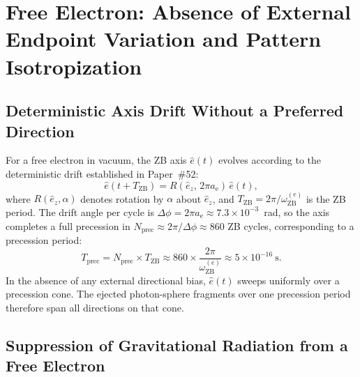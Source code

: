\documentclass[%
 reprint, amsmath,amssymb, aps, prd, ]{revtex4-2}
\numberwithin{equation}{section}
\newcommand{\anom}{a_{\mathrm{e}}}
\newcommand{\ehat}[1]{\hat{e}_{#1}}
\newcommand{\omZBe}{\omega_{\mathrm{ZB}}^{(e)}}
\begin{document}
\section{Free Electron: Absence of External Endpoint Variation and Pattern Isotropization}
\label{sec:free_electron}

\subsection{Deterministic Axis Drift Without a Preferred Direction}

For a free electron in vacuum, the ZB axis $\hat{e}(t)$ evolves according to the deterministic drift established in Paper~\#52:
\begin{equation}
\hat{e}(t + T_\mathrm{ZB}) = R(\ehat{z},\, 2\pi\anom)\,\hat{e}(t),
\label{eq:axis_drift_free}
\end{equation}
where $R(\ehat{z}, \alpha)$ denotes rotation by $\alpha$ about $\ehat{z}$, and $T_\mathrm{ZB} = 2\pi/\omZBe$ is the ZB period.
The drift angle per cycle is $\Delta\phi = 2\pi\anom \approx 7.3\times10^{-3}$~rad, so the axis completes a full precession in $N_\mathrm{prec} \approx 2\pi/\Delta\phi \approx 860$ ZB cycles, corresponding to a precession period:
\begin{equation}
T_\mathrm{prec}
= N_\mathrm{prec} \times T_\mathrm{ZB}
\approx 860 \times \frac{2\pi}{\omZBe}
\approx 5\times10^{-16}\ \text{s}.
\label{eq:prec_period}
\end{equation}
In the absence of any external directional bias, $\hat{e}(t)$ sweeps uniformly over a precession cone.
The ejected photon-sphere fragments over one precession period therefore span all directions on that cone.

\subsection{Suppression of Gravitational Radiation from a Free Electron}
\end{document}
